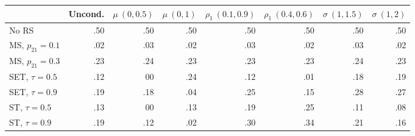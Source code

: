 \begin{tabular}{@{\extracolsep{\fill}}l|rrrrrrr}
\toprule
 & Uncond. & \(\mu ~ (0, 0.5)\) & \(\mu ~ (0, 1)\) & \(\rho_{1} ~ (0.1, 0.9)\) & \(\rho_{1} ~ (0.4, 0.6)\) & \(\sigma ~ (1, 1.5)\) & \(\sigma ~ (1, 2)\) \\ 
\midrule\addlinespace[2.5pt]
No RS & .50 & .50 & .50 & .50 & .50 & .50 & .50 \\ 
MS, \(p_{21} = 0.1\) & .02 & .03 & .02 & .03 & .02 & .03 & .02 \\ 
MS, \(p_{21} = 0.3\) & .23 & .24 & .23 & .23 & .23 & .24 & .23 \\ 
SET, \(\tau = 0.5\) & .12 & 00 & .24 & .12 & .01 & .18 & .19 \\ 
SET, \(\tau = 0.9\) & .19 & .18 & .04 & .25 & .15 & .28 & .27 \\ 
ST, \(\tau = 0.5\) & .13 & 00 & .13 & .19 & .25 & .11 & .08 \\ 
ST, \(\tau = 0.9\) & .19 & .12 & .02 & .30 & .34 & .21 & .16 \\ 
\bottomrule
\end{tabular}
